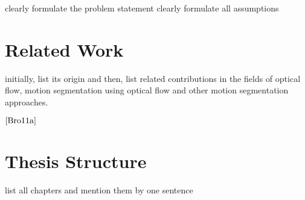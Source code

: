 clearly formulate the problem statement
clearly formulate all assumptions

\section{Related Work}
initially, list its origin and then, list related contributions in the fields of optical flow, motion segmentation using optical flow and other motion segmentation approaches. 



$\cite{Bro11a}$

\section{Thesis Structure}

list all chapters and mention them by one sentence